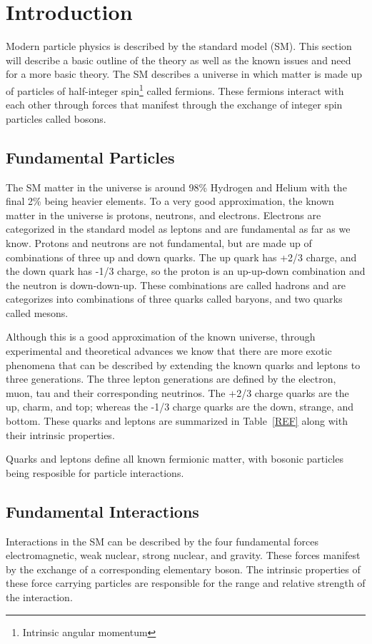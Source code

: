 \chapter{Introduction}
\label{sec:intro}
Modern particle physics is described by the standard model (SM).  This section will describe a basic outline of the theory as well as the known issues and need for a more basic theory.
The SM describes a universe in which matter is made up of particles of half-integer spin\footnote{Intrinsic angular momentum} called fermions.  
These fermions interact with each other through forces that manifest through the exchange of integer spin particles called bosons.  

\section{Fundamental Particles}
The SM matter in the universe is around 98\% Hydrogen and Helium with the final 2\% being heavier elements.  
To a very good approximation, the known matter in the universe is protons, neutrons, and electrons.  
Electrons are categorized in the standard model as leptons and are fundamental as far as we know.  
Protons and neutrons are not fundamental, but are made up of combinations of three up and down quarks.  
The up quark has +2/3 charge, and the down quark has -1/3 charge, so the proton is an up-up-down combination and the neutron is down-down-up.  
These combinations are called hadrons and are categorizes into combinations of three quarks called baryons, and two quarks called mesons.

Although this is a good approximation of the known universe, through experimental and theoretical advances we know that there are 
more exotic phenomena that can be described by extending the known quarks and leptons to three generations.  
The three lepton generations are defined by the electron, muon, tau and their corresponding neutrinos.
The +2/3 charge quarks are the up, charm, and top; whereas the -1/3 charge quarks are the down, strange, and bottom.  
These quarks and leptons are summarized in Table~\ref{REF} along with their intrinsic properties.
    
Quarks and leptons define all known fermionic matter, with bosonic particles being resposible for particle interactions.
    
\section{Fundamental Interactions}
Interactions in the SM can be described by the four fundamental forces electromagnetic, weak nuclear, strong nuclear, and gravity.  
These forces manifest by the exchange of a corresponding elementary boson.  
The intrinsic properties of these force carrying particles are responsible for the range and relative strength of the interaction.


